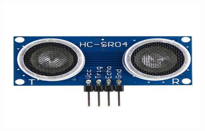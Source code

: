 \documentclass[
	11pt, %
	aspectratio=169, %
]{beamer}
\begin{document}
\begin{frame}
\begin{center}
\begin{minipage}{0.30\textwidth}
			\includegraphics[width=\textwidth]{./resized_400x250/ultrasonic sensor.jpg}
		\end{minipage}
	

\end{center}
\end{frame}
\end{document}
